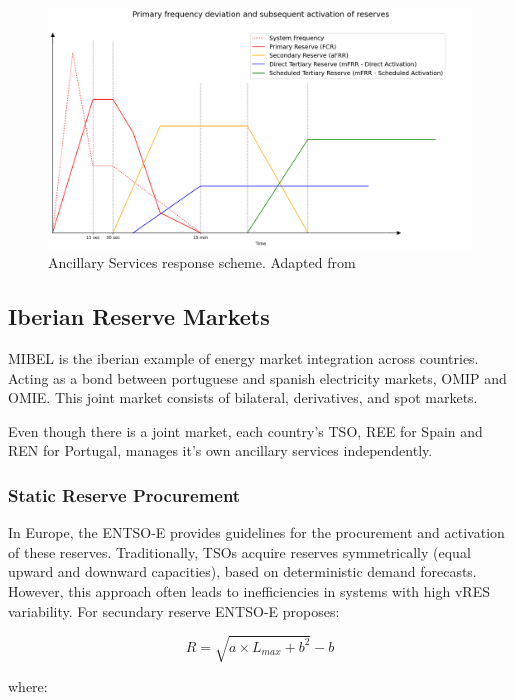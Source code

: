 \begin{figure}[H]
  \centering
  \includegraphics[width=\textwidth]{plots/actiavtion_example_eng.png}
  \caption{Ancillary Services response scheme. Adapted from \cite{handbook2009policy}}
  \label{fig:Ancillary_Services_response_scheme}
\end{figure}
\unskip



\subsection{Iberian Reserve Markets}

\gls{MIBEL} is the iberian example of energy market integration across countries. Acting as a bond between portuguese and spanish electricity markets, \gls{OMIP} and \gls{OMIE}. This joint market consists of bilateral, derivatives, and spot markets.\par
Even though there is a joint market, each country's \gls{TSO}, \gls{REE} for Spain and \gls{REN} for Portugal, manages it's own ancillary services independently. 

\subsubsection{Static Reserve Procurement}
In Europe, the \gls{ENTSO-E} provides guidelines for the procurement and activation of these reserves. Traditionally, \gls{TSO}s acquire reserves symmetrically (equal upward and downward capacities), based on deterministic demand forecasts. However, this approach often leads to inefficiencies in systems with high \gls{vRES} variability.
%
For secundary reserve \gls{ENTSO-E} proposes:
\begin{linenomath}
\begin{equation}\label{eq:BRENTSOE} 
    R = \sqrt{a \times  L_{max} + b^{2}} - b 
\end{equation}
\end{linenomath}
where:

